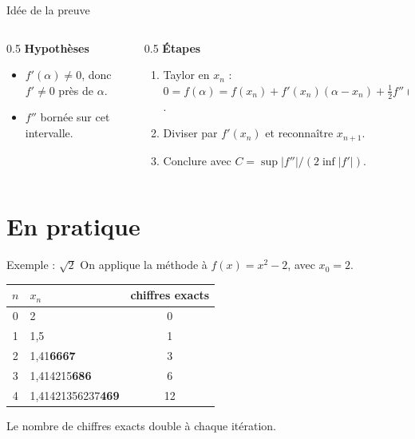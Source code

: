 \documentclass{beamer}
\begin{document}
\begin{frame}{Idée de la preuve}
  \begin{columns}
    \begin{column}{0.5\textwidth}
      \textbf{Hypothèses}
      \begin{itemize}
        \item $f'(\alpha)\neq 0$, donc $f'\neq 0$ près de $\alpha$.
        \item $f''$ bornée sur cet intervalle.
      \end{itemize}
    \end{column}
    \begin{column}{0.5\textwidth}
      \textbf{Étapes}
      \begin{enumerate}
        \item Taylor en $x_n$ : $0 = f(\alpha) = f(x_n) + f'(x_n)(\alpha-x_n) + \tfrac12 f''(\xi)(\alpha-x_n)^2$.
        \item Diviser par $f'(x_n)$ et reconnaître $x_{n+1}$.
        \item Conclure avec $C = \sup|f''| / (2\inf|f'|)$.
      \end{enumerate}
    \end{column}
  \end{columns}
\end{frame}

\section{En pratique}

\begin{frame}{Exemple : $\sqrt{2}$}
  On applique la méthode à $f(x) = x^2-2$, avec $x_0 = 2$.
  \begin{center}
    \begin{tabular}{c l c}
      $n$ & $x_n$ & chiffres exacts \\ \hline
      0 & 2 & 0 \\
      1 & 1,5 & 1 \\
      2 & 1,41\textbf{6667} & 3 \\
      3 & 1,414215\textbf{686} & 6 \\
      4 & 1,41421356237\textbf{469} & 12 \\
    \end{tabular}
  \end{center}
  \pause
  Le nombre de chiffres exacts double à chaque itération.
\end{frame}
\end{document}
